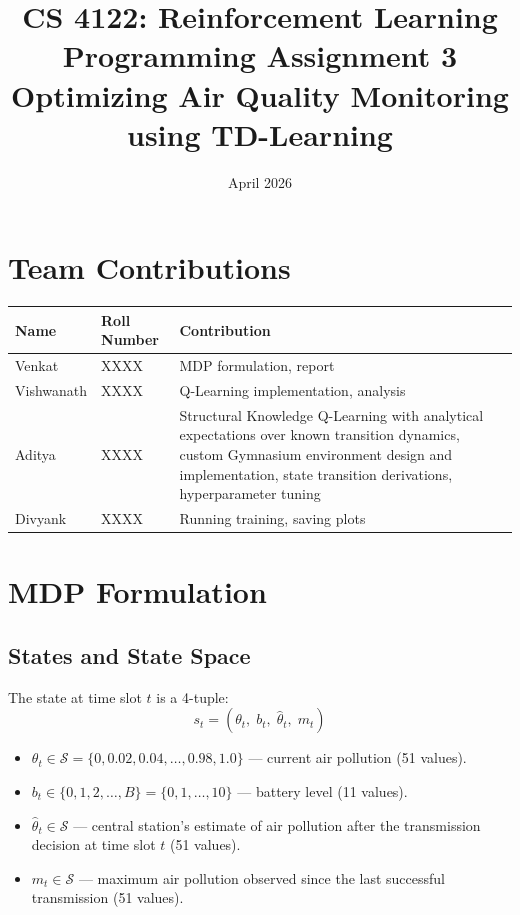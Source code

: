 \documentclass[12pt, a4paper]{article}
\title{\textbf{CS 4122: Reinforcement Learning} \\ Programming Assignment 3 \\
\large Optimizing Air Quality Monitoring using TD-Learning}
\date{April 2026}
\begin{document}
\maketitle
\tableofcontents
\newpage

\section{Team Contributions}

\begin{center}
\begin{tabular}{lll}
\toprule
\textbf{Name} & \textbf{Roll Number} & \textbf{Contribution} \\
\midrule
Venkat   & XXXX & MDP formulation, report \\
Vishwanath & XXXX & Q-Learning implementation, analysis \\
Aditya   & XXXX & Structural Knowledge Q-Learning with analytical expectations over known transition dynamics, custom Gymnasium environment design and implementation, state transition derivations, hyperparameter tuning \\
Divyank  & XXXX & Running training, saving plots \\
\bottomrule
\end{tabular}
\end{center}

\newpage

\section{MDP Formulation}

\subsection{States and State Space}

The state at time slot $t$ is a 4-tuple:
\[
s_t = (\theta_t,\; b_t,\; \hat{\theta}_t,\; m_t)
\]

\begin{itemize}
    \item $\theta_t \in \mathcal{S} = \{0, 0.02, 0.04, \ldots, 0.98, 1.0\}$ — current air pollution (51 values).
    \item $b_t \in \{0, 1, 2, \ldots, B\} = \{0, 1, \ldots, 10\}$ — battery level (11 values).
    \item $\hat{\theta}_t \in \mathcal{S}$ — central station's estimate of air pollution after the transmission decision at time slot $t$ (51 values).
    \item $m_t \in \mathcal{S}$ — maximum air pollution observed since the last successful transmission (51 values).
\end{itemize}
\end{document}
